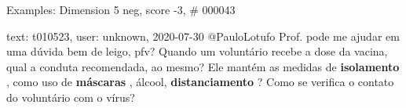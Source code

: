 \begin{frame}{Examples: Dimension 5 neg, score -3, \# 000043}
\footnotesize
\begin{alertblock}{text: t010523, user: unknown, 2020-07-30}
@PauloLotufo Prof. pode me ajudar em uma dúvida bem de leigo, pfv? Quando um 
voluntário recebe a dose da vacina, qual a conduta recomendada, ao mesmo? Ele 
mantém as medidas de \textbf{isolamento} , como uso de \textbf{máscaras} , 
álcool, \textbf{distanciamento} ? Como se verifica o contato do voluntário com 
o vírus? 
\end{alertblock}
\end{frame}
